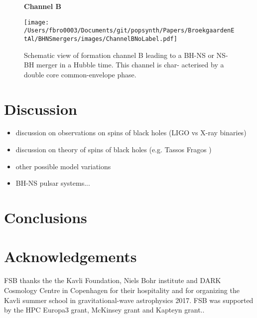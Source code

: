 \documentclass[a4paper,fleqn,usenatbib,useAMS,usedcolumn]{mnras}
\begin{document}
 

\begin{figure}
\begin{center}
\Large {\textbf{\hspace{-0.5cm}Channel B }}\par\medskip
	\texttt{[image: /Users/fbro0003/Documents/git/popsynth/Papers/BroekgaardenEtAl/BHNSmergers/images/ChannelBNoLabel.pdf]}
    \caption{Schematic view of formation channel B leading to a
BH-NS or NS-BH merger in a Hubble time. This channel is char-
acterised by a double core common-envelope phase.}
    \label{fig:subchannelsMainB}
\end{center}
\end{figure}
% 


 
 

\section{Discussion}
\label{sec:discussion}
%
\begin{itemize}
	\item discussion on observations on spins of black holes (LIGO vs X-ray binaries) 
	\item discussion on theory of spins of black holes (e.g. Tassos Fragos ) 
	\item other possible model variations
	\item BH-NS pulsar systems...
\end{itemize}


\section{Conclusions}
\label{sec:conclusion}













\section*{Acknowledgements}

 

FSB thanks the the Kavli Foundation, Niels Bohr institute and DARK Cosmology Centre in Copenhagen for their hospitality and for organizing the Kavli summer school in gravitational-wave astrophysics 2017.  FSB was supported by the HPC  Europa3 grant, McKinsey grant and Kapteyn grant..
\end{document}
